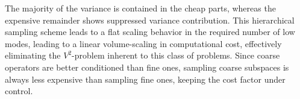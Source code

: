 The majority of the variance is contained in the cheap parts, whereas the expensive remainder shows suppressed variance contribution.
This hierarchical sampling scheme leads to a flat scaling behavior in the required number of low modes, leading to a linear volume-scaling in computational cost, effectively eliminating the $V^{2}$-problem inherent to this class of problems.
Since coarse operators are better conditioned than fine ones, sampling coarse subspaces is always less expensive than sampling fine ones, keeping the cost factor under control.


